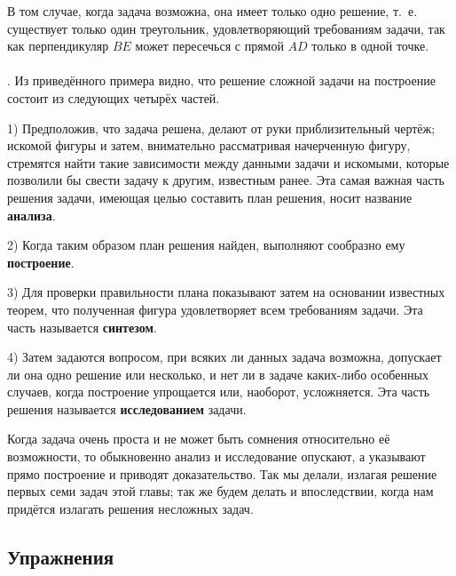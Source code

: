 \documentclass[oneside]{book}
\begin{document}
В том случае, когда задача возможна, она имеет только одно решение, т.~е. существует только один треугольник, удовлетворяющий требованиям задачи, так как перпендикуляр $BE$ может пересечься с прямой $AD$ только в одной точке.

\paragraph{}\label{1938/69}
.
Из приведённого примера видно, что решение сложной задачи на построение состоит из следующих четырёх частей.

1) Предположив, что задача решена, делают от руки приблизительный чертёж;
искомой фигуры и затем, внимательно рассматривая начерченную фигуру, стремятся найти такие зависимости между данными задачи и искомыми, которые позволили бы свести задачу к другим, известным ранее.
Эта самая важная часть решения задачи, имеющая целью составить план решения, носит название \textbf{анализа}.

2) Когда таким образом план решения найден, выполняют сообразно ему \textbf{построение}.

3) Для проверки правильности плана показывают затем на основании известных теорем, что полученная фигура удовлетворяет всем требованиям задачи.
Эта часть называется \textbf{синтезом}.

4) Затем задаются вопросом, при всяких ли данных задача возможна, допускает ли она одно решение или несколько, и нет ли в задаче каких-либо особенных случаев, когда построение упрощается или, наоборот, усложняется.
Эта часть решения называется \textbf{исследованием} задачи.

Когда задача очень проста и не может быть сомнения относительно её возможности, то обыкновенно анализ и исследование опускают, а указывают прямо построение и приводят доказательство.
Так мы делали, излагая решение первых семи задач этой главы;
так же будем делать и впоследствии, когда нам придётся излагать решения несложных задач.

\subsection*{Упражнения}

\begin{center}
\end{center}
\end{document}
